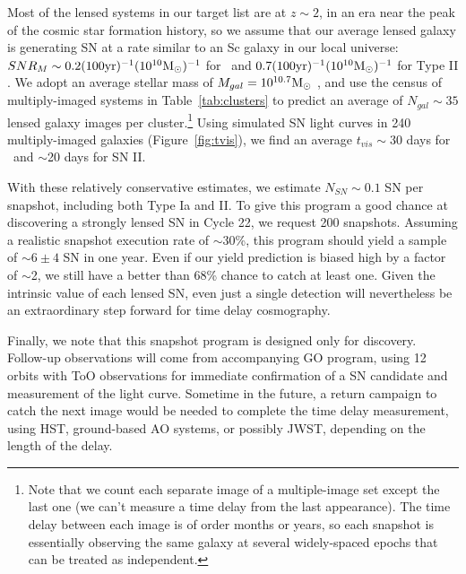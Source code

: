 Most of the lensed systems in our target list are at $z\sim 2$, in an
era near the peak of the cosmic star formation history, so we assume
that our average lensed galaxy is generating SN at a rate similar to
an Sc galaxy in our local universe: $SNR_{M} \sim0.2
(100 \mbox{yr})^{-1} (10^{10} \mbox{M$_{\odot}$})^{-1}$ for \SNIa\ and $0.7
(100 \mbox{yr})^{-1} (10^{10} \mbox{M$_{\odot}$})^{-1}$ for Type
II \citep{Mannucci:2005}.  We adopt an average stellar mass of
$M_{gal}=10^{10.7} \mbox{M$_{\odot}$}$ \citep{Tomczak:2013}, and use the census of
multiply-imaged systems in Table~\ref{tab:clusters} to predict an
average of $N_{gal}\sim 35$ lensed galaxy images per
cluster.\footnote{Note that we count each separate image of a
multiple-image set except the last one (we can't measure a time delay
from the last appearance). The time delay between each image is of
order months or years, so each snapshot is essentially observing the
same galaxy at several widely-spaced epochs that can be treated as
independent.}  Using simulated SN light curves in 240 multiply-imaged
galaxies (Figure~\ref{fig:tvis}), we find an average $t_{vis}\sim 30$
days for \SNIa\ and $\sim$20 days for SN II.


With these relatively conservative estimates, we estimate $N_{SN}\sim
0.1$ SN per snapshot, including both Type Ia and II.  To give this
program a good chance at discovering a strongly lensed SN in Cycle 22,
we request 200 snapshots.  Assuming a realistic snapshot execution
rate of $\sim$30\%, this program should yield a sample of $\sim 6 \pm
4$ SN in one year.  Even if our yield prediction is biased high by a
factor of $\sim$2, we still have a better than 68\% chance to catch at
least one.  Given the intrinsic value of each lensed SN, even just a
single detection will nevertheless be an extraordinary step forward
for time delay cosmography.

Finally, we note that this snapshot program is designed only for
discovery. Follow-up observations will come from accompanying GO
program, using 12 orbits with ToO observations for immediate
confirmation of a SN candidate and measurement of the light curve.
Sometime in the future, a return campaign to catch the next image
would be needed to complete the time delay measurement, using HST,
ground-based AO systems, or possibly JWST, depending on the length of
the delay.









